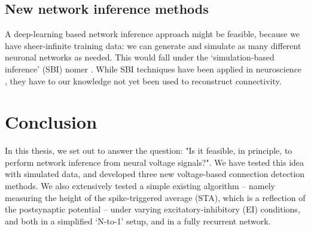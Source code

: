 \subsection{New network inference methods}


A deep-learning based network inference approach might be feasible, because we have sheer-infinite training data: we can generate and simulate as many different neuronal networks as needed. This would fall under the `simulation-based inference' (SBI) nomer \cite{Cranmer2020FrontierSimulationbasedInference}. While SBI techniques have been applied in neuroscience \cite{Goncalves2020TrainingDeepNeural}, they have to our knowledge not yet been used to reconstruct connectivity.




\section{Conclusion}

In this thesis, we set out to answer the question: "Is it feasible, in principle, to perform network inference from neural voltage signals?". We have tested this idea with simulated data, and developed three new voltage-based connection detection methods.
We also extensively tested a simple existing algorithm -- namely measuring the height of the spike-triggered average (STA), which is a reflection of the postsynaptic potential -- under varying excitatory-inhibitory (EI) conditions, and both in a simplified `N-to-1' setup, and in a fully recurrent network.

